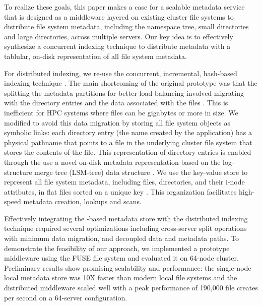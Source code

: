 To realize these goals, this paper makes a case for a scalable metadata service 
that is designed as a middleware layered on existing cluster file systems to 
distribute file system metadata, including the namespace tree, small 
directories and large directories, across multiple servers.
Our key idea is to effectively synthesize a concurrent indexing 
technique to distribute metadata with a tablular, on-disk representation of all
file system metadata. 

For distributed indexing, we re-use the concurrent, incremental, hash-based
\giga{} indexing technique \citep{giga}.
The main shortcoming of the original \giga{} prototype was that the splitting
the metadata partitions for better load-balancing involved migrating with the
directory entries and the data associated with the files \citep{giga}.
This is inefficient for HPC systems where files can be gigabytes or more in
size. We modified \giga{} to avoid this data migration by storing all file
system objects as symbolic links: each directory entry (the name created by the
application) has a physical pathname that points to a file in the underlying
cluster file system that stores the contents of the file.
This representation of directory entries is enabled through the use a novel
on-disk metadata representation based on the log-structure merge tree (LSM-tree)
data structure \citep{ONeil1996}.
We use the \ldb{} key-value store to represent all file system metadata, including 
files, directories, and their i-node attributes, in flat files sorted on a
unique key \citep{LevelDB}.
This organization facilitates high-speed metadata creation, lookups and scans.

Effectively integrating the \ldb-based metadata store with the distributed indexing
technique required several optimizations including cross-server split operations 
with minimum data migration, and decoupled data and metadata paths.
To demonstrate the feasibility of our approach, we implemented a prototype middleware
using the FUSE file system and evaluated it on 64-node cluster. Preliminary
results show promising scalability and performance: the single-node local metadata 
store was 10X faster than modern local file systems and the distributed
middleware scaled well with a peak performance of 190,000 file creates per second 
on a 64-server configuration. 


